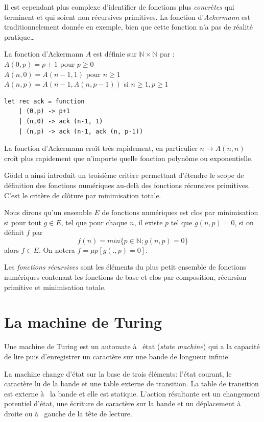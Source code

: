 Il est cependant plus complexe d'identifier de fonctions plus \textit{concrètes}
 qui terminent et qui soient non récursives primitives.
La fonction d'\textit{Ackermann} est traditionnelement donnée en exemple, bien que cette fonction n'a pas
de réalité pratique\dots

La fonction d’Ackermann $A$ est définie sur $\mathbb{N} × \mathbb{N}$ par : \\
$A(0, p) = p + 1$ pour $p \geq  0$ \\
$A(n, 0) = A(n - 1, 1)$ pour $n \geq  1$ \\
$A(n, p) = A(n - 1, A(n, p - 1))$ si $n \geq  1, p \geq  1$ \\ 

\begin{Verbatim}
let rec ack = function
	| (0,p) -> p+1
	| (n,0) -> ack (n-1, 1)
	| (n,p) -> ack (n-1, ack (n, p-1))
\end{Verbatim}

La fonction d’Ackermann croît très rapidement, en particulier $n \rightarrow A(n, n)$ croît
plus rapidement que n’importe quelle fonction polynôme ou exponentielle.

Gödel a ainsi introduit un troisième critère permettant d'étendre le scope de définition des
fonctions numériques au-delà des fonctions récursives primitives. C'est le critère
de clôture par minimisation totale.

Nous dirons qu'un ensemble $E$ de fonctions numériques est clos par minimisation si
pour tout $g \in E$, tel que pour chaque $n$, il existe $p$ tel que $g(n,p)=0$, si on définit
$f$ par
$$ f(n) = min\{p\in \mathbb{N} ; g(n,p) = 0   \} $$
alors $f\in E$. On notera $f =\mu p [g(.,p)=0]$.

Les  \textit{fonctions récursives} sont les éléments du plus petit ensemble de fonctions
numériques contenant les fonctions de base et clos par composition, récursion primitive et 
minimisation totale.

\section{La machine de Turing}
Une machine de Turing est un automate à  état (\textit{state machine}) qui a la
capacité de lire puis  d'enregistrer un caractère sur une bande de longueur
infinie. 

La machine change d'état sur la base de trois éléments: l'état courant,
le caractère lu de la bande et une table externe de transition. La table de
transition est externe à  la bande et elle est statique.
 L'action résultante est un changement potentiel d'état, une écriture de
 caractère sur la bande et un déplacement à  droite ou à  gauche de la tête de
 lecture.


